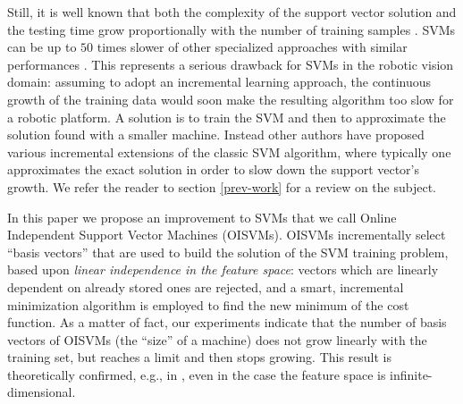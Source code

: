 Still, it is well known that 
both
the complexity of the
support vector solution and the testing time grow proportionally with the number of
training samples \cite{Steinwart03}. SVMs can be up to $50$ times slower of other
specialized approaches with similar performances
\cite{BurgesS96}. This represents a serious drawback for SVMs in the robotic vision 
domain: assuming to adopt an incremental learning approach, the continuous growth of the training data would
soon make the resulting algorithm too slow for a robotic platform.
A solution is to train the SVM and then to approximate the
solution found with a smaller machine. Instead other authors have
proposed various incremental extensions
of the classic SVM algorithm, where typically
one approximates the exact solution in order to slow down the
support vector's growth. We refer the reader to section
\ref{prev-work} for a review on the subject.

In this paper we propose an improvement to SVMs that we call Online
Independent Support Vector Machines (OISVMs). OISVMs incrementally
select ``basis vectors'' that are used to build the solution of the
SVM training problem, based upon \emph{linear independence in the
feature space}: vectors which are linearly dependent on already stored
ones are rejected, and a smart, incremental minimization algorithm is
employed to find the new minimum of the cost function. As a matter of
fact, our experiments indicate that the number of basis vectors of
OISVMs (the ``size'' of a machine) does not grow linearly with the
training set, but reaches a limit and then stops growing.
This result is theoretically confirmed,
e.g., in \cite{engel2004}, even in the case the feature space is
infinite-dimensional.

